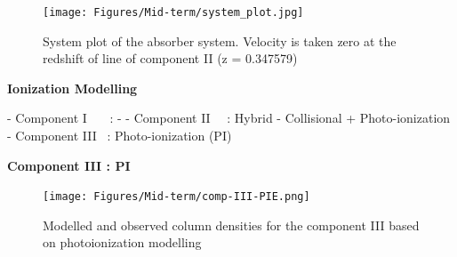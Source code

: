 \documentclass[aspectratio=169]{beamer}
\newcommand\ion[2]{\text{#1\,\textsc{\lowercase{#2}}}}
\begin{document}
\begin{markdown}

\begin{frame}[plain]{}

\begin{figure}[!htbp]
          \centering
          \texttt{[image: Figures/Mid-term/system\_plot.jpg]}
          \vspace*{-1mm}
          \caption{System plot of the absorber system. Velocity is taken zero at the redshift of \ion{O}{vi} line of component II (z = 0.347579)}
\end{figure}   

\end{frame}

\begin{frame}{\huge{{\textbf{Ionization Modelling}}}}

- Component I \ \ \ : -
- Component II \ \  : Hybrid - Collisional + Photo-ionization
- Component III   \ : Photo-ionization (PI)

\end{frame}

\begin{frame}{\textbf{Component III : PI}}



\end{frame}

\begin{frame}{}

\begin{figure}[!htbp]
          \centering
          \texttt{[image: Figures/Mid-term/comp-III-PIE.png]}
          \vspace*{-1mm}
          \caption{Modelled and observed column densities for the component III based on photoionization modelling}
\end{figure}



\end{frame}
\end{markdown}
\end{document}
